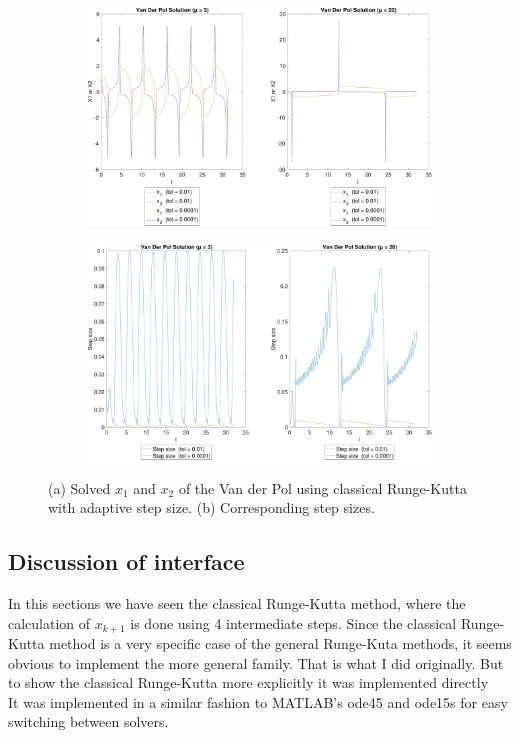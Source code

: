 \begin{figure}[h]
\centering
\begin{subfigure}[b]{\textwidth}
   \includegraphics[width=1\linewidth]{plots/5_4a.pdf}
   \caption{}
   \label{fig:5_4a} 
\end{subfigure}

\begin{subfigure}[b]{\textwidth}
   \includegraphics[width=1\linewidth]{plots/5_4b.pdf}
   \caption{}
   \label{fig:5_4b}
\end{subfigure}

\caption[Two numerical solutions]{(a) Solved $x_1$ and $x_2$ of the Van der Pol using classical Runge-Kutta with adaptive step size. (b) Corresponding step sizes.}
\end{figure}



\subsection{Discussion of interface}
In this sections we have seen the classical Runge-Kutta method, where the calculation of $x_{k+1}$ is done using 4 intermediate steps. Since the classical Runge-Kutta method is a very specific case of the general Runge-Kuta methods, it seems obvious to implement the more general family. That is what I did originally. But to show the classical Runge-Kutta more explicitly it was implemented directly\\
It was implemented in a similar fashion to MATLAB’s ode45 and ode15s for easy switching between solvers.
